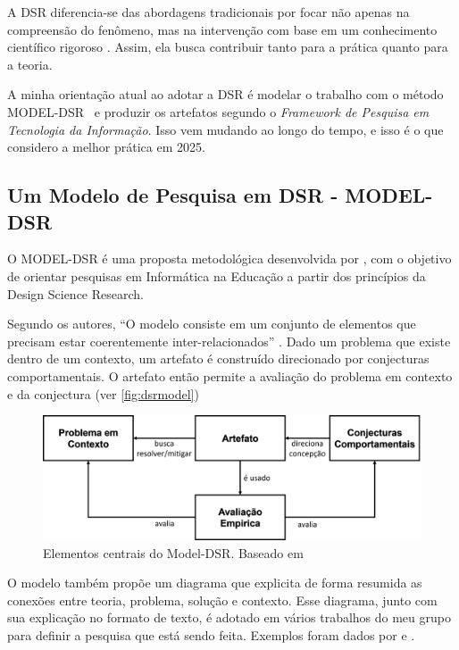 A DSR diferencia-se das abordagens tradicionais por focar não apenas na compreensão do fenômeno, mas na intervenção com base em um conhecimento científico rigoroso \citep{hevner2004design, peffers2007design}. Assim, ela busca contribuir tanto para a prática quanto para a teoria.

A minha orientação atual ao adotar a DSR é modelar o trabalho com o método MODEL-DSR~\citep{pimentel2019dsr,pimentel2023} e produzir os artefatos segundo o \textit{Framework de Pesquisa em Tecnologia da Informação}\citep{march1995design}. Isso vem mudando ao longo do tempo, e isso é o que considero a melhor prática em 2025.


\subsection{Um Modelo de Pesquisa em DSR - MODEL-DSR}

O MODEL-DSR é uma proposta metodológica desenvolvida por \citet{pimentel2019dsr,pimentel2023}, com o objetivo de orientar pesquisas em Informática na Educação a partir dos princípios da Design Science Research. 

Segundo os autores, ``O modelo consiste em um conjunto de elementos que precisam estar coerentemente inter-relacionados'' \citep{pimentel2023}. Dado um problema que existe dentro de um contexto, um artefato é construído direcionado por conjecturas comportamentais. O artefato então permite a avaliação do problema em contexto e da conjectura (ver \autoref{fig:dsrmodel})

\begin{figure}
    \centering
    \includegraphics[width=0.5\linewidth]{Images/dsr pimental.png}
    \caption{Elementos centrais do Model-DSR. Baseado em \citep{pimentel2023}}
    \label{fig:dsrmodel}
\end{figure}

O modelo também propõe um diagrama que explicita de forma resumida as conexões entre teoria, problema, solução e contexto. Esse diagrama, junto com sua explicação no formato de texto, é adotado em vários trabalhos do meu grupo para definir a pesquisa que está sendo feita. Exemplos foram dados por \citet{pimentel2019dsr} e \citet{pimentel2023}.

